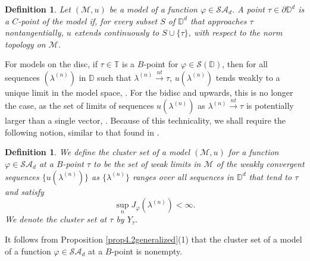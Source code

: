 \documentclass[11pt, reqno]{amsart}
\newtheorem{definition}[theorem]{Definition}
\newcommand\1{\boldsymbol {1}}
\numberwithin{equation}{section}
\begin{document}
\begin{definition}{}
Let $(\mathcal{M},u)$ be a model of a function $\varphi\in \mathcal{SA}_{d}$.
 A point $\tau\in\partial\mathbb{D}^{d}$ is a {\em{$C$-point of the model}} if, for every subset $S$ of $\mathbb{D}^{d}$ that approaches $\tau$ nontangentially, $u$ extends continuously to $S\cup\{\tau\}$, with respect to the norm topology on $\mathcal{M}$. 
\end{definition}

For models on the disc, if $\tau\in\mathbb{T}$ is a $B$-point for $\varphi\in\mathcal{S}(\mathbb{D})$, then for all 
sequences $(\lambda^{(n)}) $ in $\mathbb{D}$ such that 
$\lambda^{(n)}{\overset{nt}\rightarrow}\tau$, $u(\lambda^{(n)})$ tends weakly to a  unique limit in the model space, \cite[Proposition 5.30]{AMYOperatorbook}. For the bidisc and upwards, this is no longer the case, as the set of limits of sequences $u(\lambda^{(n)})$ as $\lambda^{(n)}{\overset{nt}\rightarrow}\tau$ is potentially larger than a single vector, \cite[Page 147]{AMYOperatorbook}. Because of this technicality, we shall require the following notion, similar to that found in \cite[Section 4]{AMYcara}.
\begin{definition}{}\label{Clustersetattau}
We define the {\em{cluster set}} of a model $(\mathcal{M},u)$ for a function $\varphi \in \mathcal{SA}_{d}$ at a $B$-point $\tau$ to be the set of weak limits in $\mathcal{M}$ of the weakly convergent sequences $\{u(\lambda^{(n)})\}$ as $\{\lambda^{(n)}\}$ ranges over all sequences in $\mathbb{D}^{d}$ that tend to $\tau$ and satisfy
\begin{equation}\label{boundedconditionforBpointonDd}
\sup_{n} J_{\varphi}(\lambda^{(n)})<\infty.
\end{equation}
We denote the cluster set at $\tau$ by $Y_{\tau}$.
\end{definition}
It follows from Proposition \ref{prop4.2generalized}(1) that the cluster set of a model of a function $\varphi \in \mathcal{SA}_{d}$ at a $B$-point is nonempty. 
\end{document}

